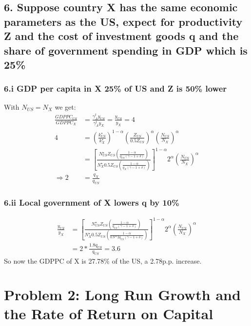 \documentclass[10pt,letter]{article}
\begin{document}
\subsection*{6. Suppose country X has the same economic parameters as the US, expect for productivity Z and the cost of investment goods q and the share of government spending in GDP which is 25\%}
\subsubsection*{6.i GDP per capita in X 25\% of US and Z is 50\% lower}
With $N_{US}=N_X$ we get:
\begin{align*}
\frac{GDPPC_{US}}{GDPPC_X} &= \frac{\gamma_A^t y_{US}}{\gamma_A^t y_X}=\frac{y_{US}}{y_X}=4\\
4 &= \left( \frac{k^\star_{US}}{k^\star_X}\right)^{1-\alpha} \left( \frac{Z_{US}}{0.5Z_{US}} \right)^\alpha\left(\frac{N_{US}}{N_X}\right)^\alpha\\
&=\left[\frac{N^\star_{US}Z_{US}\left(\frac{1-\alpha}{q_{US}(\gamma-1+\delta)}\right)}{N^\star_{X}0.5Z_{US}\left(\frac{1-\alpha}{q_{X}(\gamma-1+\delta)}\right)}\right]^{1-\alpha} 2^\alpha \left(\frac{N_{US}}{N_X}\right)^\alpha\\
\Rightarrow2 &= \frac{q_X}{q_{US}}
\end{align*}
\subsubsection*{6.ii Local government of X lowers q by 10\%}
 \begin{align*}
 \frac{y_{US}}{y_X} &= \left[\frac{N^\star_{US}Z_{US}\left(\frac{1-\alpha}{q_{US}(\gamma-1+\delta)}\right)}{N^\star_{X}0.5Z_{US}\left(\frac{1-\alpha}{0.9*2q_{US}(\gamma-1+\delta)}\right)}\right]^{1-\alpha} 2^\alpha \left(\frac{N_{US}}{N_X}\right)^\alpha\\
  &= 2*\frac{1.8q_{US}}{q_{US}} = 3.6
 \end{align*}
So now the GDPPC of X is 27.78\% of the US, a 2.78p.p. increase.

\newpage

\section*{Problem 2: Long Run Growth and the Rate of Return on Capital}
\end{document}
